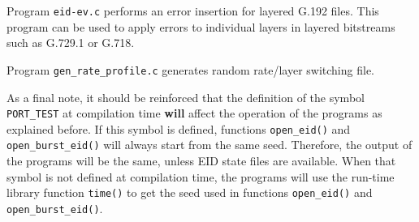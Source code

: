Program {\tt eid-ev.c} performs an error insertion for layered G.192
files.  This program can be used to apply errors to individual layers
in layered bitstreams such as G.729.1 or G.718.

Program {\tt gen\_rate\_profile.c} generates random rate/layer switching file.

As a final note, it should be reinforced that the definition of the
symbol {\tt PORT\_TEST} at compilation time {\bf will} affect the
operation of the programs as explained before. If this symbol is
defined, functions {\tt open\_eid()} and {\tt open\_burst\_eid()} will
always start from the same seed. Therefore, the output of the programs
will be the same, unless EID state files are available. When that
symbol is not defined at compilation time, the programs will use the
run-time library function {\tt time()} to get the seed used in
functions {\tt open\_eid()} and {\tt open\_burst\_eid()}.

